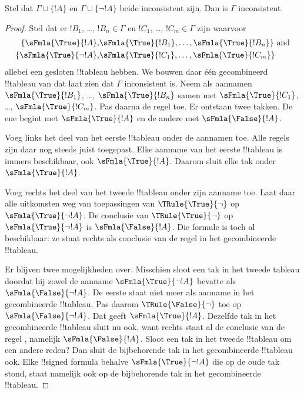 \documentclass[../../../include/open-logic-section]{subfiles}
\begin{document}
\begin{prop}
  Stel dat $\Gamma \cup \{!A\}$ en $\Gamma \cup \{\lnot !A\}$ beide
  inconsistent zijn. Dan is $\Gamma$ inconsistent.
\end{prop}

\begin{proof}
  Stel dat er $!B_1$, \dots, $!B_n \in \Gamma$ en $!C_1$, \dots,
  $!C_m \in \Gamma$ zijn waarvoor
  \begin{align*}
    \{\sFmla{\True}{!A}, &
    \sFmla{\True}{!B_1}, \dots, \sFmla{\True}{!B_n}\} \text{ and}\\
    \{\sFmla{\True}{\lnot !A}, &
    \sFmla{\True}{!C_1}, \dots, \sFmla{\True}{!C_m}\}
  \end{align*}
  allebei een gesloten !!{tableau} hebben. We bouwen daar één
  gecombineerd !!{tableau} van dat laat zien dat $\Gamma$ inconsistent
  is. Neem als aannamen
  $\sFmla{\True}{!B_1}$, \dots, $\sFmla{\True}{!B_n}$ samen met
  $\sFmla{\True}{!C_1}$, \dots, $\sFmla{\True}{!C_m}$. Pas daarna de
  regel \Cut{} toe. Er ontstaan twee takken. De ene begint met
  $\sFmla{\True}{!A}$ en de andere met $\sFmla{\False}{!A}$.  
  
  Voeg links het deel van het eerste !!{tableau} onder de aannamen
  toe. Alle regels zijn daar nog steeds juist toegepast. Elke aanname
  van het eerste !!{tableau} is immers beschikbaar, ook
  $\sFmla{\True}{!A}$. Daarom sluit elke tak onder
  $\sFmla{\True}{!A}$. 
  
  Voeg rechts het deel van het tweede !!{tableau} onder zijn aanname
  toe. Laat daar alle uitkomsten weg van toepassingen van
  $\TRule{\True}{\lnot}$ op $\sFmla{\True}{\lnot !A}$. De conclusie
  van $\TRule{\True}{\lnot}$ op $\sFmla{\True}{\lnot !A}$ is
  $\sFmla{\False}{!A}$. Die formule is toch al beschikbaar: ze staat
  rechts als conclusie van de regel \Cut{} in het gecombineerde
  !!{tableau}.

  Er blijven twee mogelijkheden over. Misschien sloot een tak in het
  tweede tableau doordat hij zowel de aanname
  $\sFmla{\True}{\lnot !A}$ bevatte als
  $\sFmla{\False}{\lnot !A}$. De eerste staat niet meer als aanname in
  het gecombineerde !!{tableau}. Pas daarom
  $\TRule{\False}{\lnot}$ toe op $\sFmla{\False}{\lnot !A}$. Dat geeft
  $\sFmla{\True}{!A}$. Dezelfde tak in het gecombineerde !!{tableau}
  sluit nu ook, want rechts staat al de conclusie van de regel \Cut{},
  namelijk $\sFmla{\False}{!A}$. Sloot een tak in het tweede
  !!{tableau} om een andere reden? Dan sluit de bijbehorende tak in het
  gecombineerde !!{tableau} ook. Elke !!{signed formula} behalve
  $\sFmla{\True}{\lnot !A}$ die op de oude tak stond, staat namelijk
  ook op de bijbehorende tak in het gecombineerde !!{tableau}.
  \end{proof}
\end{document}

